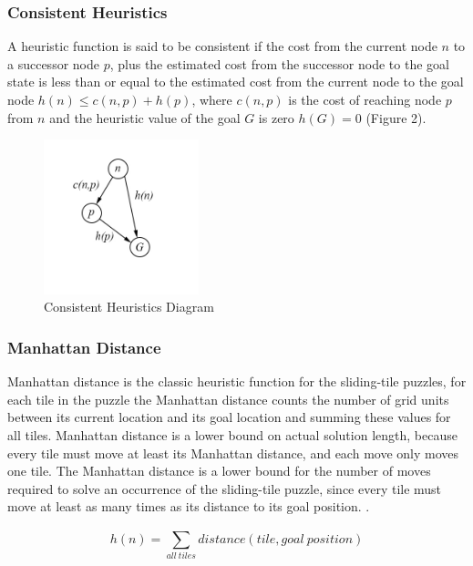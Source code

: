 \documentclass[final]{cmpreport}
\begin{document}
\subsubsection{Consistent Heuristics}
 A heuristic function is said to be consistent if the cost from the current node $n$ to a successor node $p$, plus the estimated cost from the successor node to the goal state is less than or equal to the estimated cost from the current node to the goal node $h(n)\leq c(n,p) + h(p)$, where $c(n,p)$ is the cost of reaching node $p$ from $n$ and the heuristic value of the goal $G$ is zero $h(G)=0$ (Figure 2). 


\begin{figure}[ht]
	\centering
	\includegraphics[width=0.4\textwidth]{consistent}
	\captionsetup{justification=centering}
	\caption{Consistent Heuristics Diagram}
\end{figure}



\subsubsection{Manhattan Distance}
Manhattan distance is the classic heuristic function for the sliding-tile puzzles, for each tile in the puzzle the Manhattan distance counts the number of grid units between its current location
and its goal location and summing these values for all tiles. Manhattan distance is a lower bound on actual solution length, because every tile must move at least its Manhattan distance, and each move only moves one tile. The Manhattan distance is a lower bound for the number of moves required to solve an occurrence of the sliding-tile puzzle, since every tile must move at least as many times as its distance to its goal position. \citep{DBLP:conf/ccgrid/LinnertSB14}. 

$$h(n)= \sum_{all\ tiles}^{}distance(tile, goal\ position)$$



	
\end{document}
